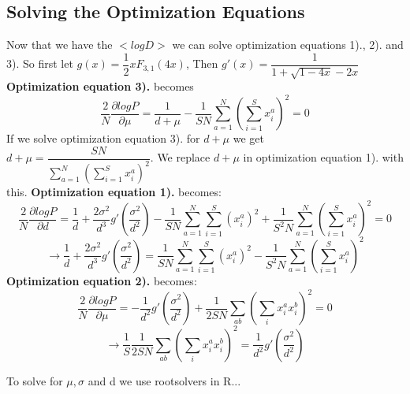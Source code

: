 \documentclass{article}
\begin{document}
\subsection{Solving the Optimization Equations}
Now that we have the $<logD>$ we can solve optimization equations 1)., 2). and 3). 
\hfill\break
So first let $g(x)=\dfrac{1}{2}xF_{3,1}(4x)$, Then $g'(x)=\dfrac{1}{1+\sqrt{1-4x}-2x}$
\hfill\break
\hfill\break
\textbf{Optimization equation 3).} becomes
$$
\dfrac{2}{N}\dfrac{\partial logP}{\partial \mu}=\dfrac{1}{d+\mu}-\dfrac{1}{SN} \sum_{a=1}^N (\sum_{i=1}^S x_i^a)^2=0
$$
If we solve optimization equation 3). for $d+\mu$ we get $d+\mu=\dfrac{SN}{ \sum_{a=1}^N (\sum_{i=1}^S x_i^a)^2}$. We replace $d+\mu$ in optimization equation 1). with this.
\hfill\break\hfill\break
\textbf{Optimization equation 1).} becomes:
$$
\dfrac{2}{N}\dfrac{\partial logP}{\partial d}=\dfrac{1}{d}+\dfrac{2\sigma^2}{d^3}g'(\dfrac{\sigma^2}{d^2})-\dfrac{1}{SN}\sum_{a=1}^N\sum_{i=1}^S(x_i^a)^2 +\dfrac{1}{S^2N} \sum_{a=1}^N (\sum_{i=1}^S x_i^a)^2=0
$$
$$
\rightarrow \dfrac{1}{d}+\dfrac{2\sigma^2}{d^3}g'(\dfrac{\sigma^2}{d^2})=\dfrac{1}{SN}\sum_{a=1}^N\sum_{i=1}^S(x_i^a)^2 - \dfrac{1}{S^2N} \sum_{a=1}^N (\sum_{i=1}^S x_i^a)^2
$$
\textbf{Optimization equation 2).} becomes:
$$
\dfrac{2}{N}\dfrac{\partial logP}{\partial \mu}=-\dfrac{1}{d^2}g'(\dfrac{\sigma^2}{d^2})+\dfrac{1}{2SN}\sum_{ab}(\sum_i x_i^a x_i ^b)^2 =0
$$
$$
\rightarrow \dfrac{1}{S}\dfrac{1}{2SN}\sum_{ab}(\sum_i x_i^a x_i ^b)^2=\dfrac{1}{d^2}g'(\dfrac{\sigma^2}{d^2})
$$

\hfill\break\hfill\break
To solve for $\mu, \sigma$ and d we use rootsolvers in R...
\end{document}

